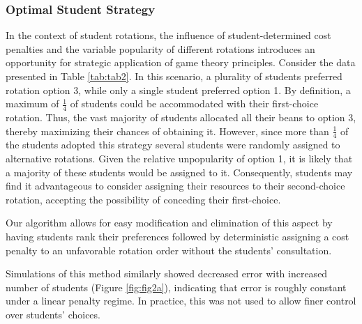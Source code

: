 \documentclass{article}
\begin{document}
\subsubsection{Optimal Student Strategy}
In the context of student rotations, the influence of student-determined cost penalties and the variable popularity of different rotations introduces an opportunity for strategic application of game theory principles. Consider the data presented in Table \ref{tab:tab2}. In this scenario, a plurality of students preferred rotation option 3, while only a single student preferred option 1. By definition, a maximum of $\frac{1}{4}$ of students could be accommodated with their first-choice rotation. Thus, the vast majority of students allocated all their beans to option 3, thereby maximizing their chances of obtaining it. However, since more than $\frac{1}{4}$ of the students adopted this strategy several students were randomly assigned to alternative rotations. Given the relative unpopularity of option 1, it is likely that a majority of these students would be assigned to it. Consequently, students may find it advantageous to consider assigning their resources to their second-choice rotation, accepting the possibility of conceding their first-choice.

Our algorithm allows for easy modification and elimination of this aspect by having students rank their preferences followed by deterministic assigning a cost penalty to an unfavorable rotation order without the students' consultation. 

Simulations of this method similarly showed decreased error with increased number of students (Figure \ref{fig:fig2a}), indicating that error is roughly constant under a linear penalty regime. In practice, this was not used to allow finer control over students' choices.
\end{document}

